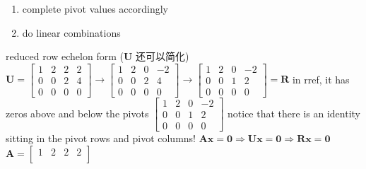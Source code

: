 \documentclass[12pt, a4paper]{article}
\begin{document}
{\begin{enumerate}
	\item complete pivot values accordingly
	\item do linear combinations
\end{enumerate}
\vspace{14pt}
reduced row echelon form (${\mathbf{U}}$ 还可以简化)
\newline
\begin{math}
	{\mathbf{U}} = 
	\begin{bmatrix}
		1 & 2 & 2 & 2 \\
		0 & 0 & 2 & 4 \\
		0 & 0 & 0 & 0 
	\end{bmatrix}
	\longrightarrow
	\begin{bmatrix}
		1 & 2 & 0 & -2 \\
		0 & 0 & 2 & 4 \\
		0 & 0 & 0 & 0 
	\end{bmatrix}
	\longrightarrow
	\begin{bmatrix}
		{\boxed{1}} & 2 & 0 & -2 \\
		0 & 0 & {\boxed{1}} & 2 \\
		0 & 0 & 0 & 0 
	\end{bmatrix}
	 = 
	{\mathbf{R}}
\end{math}
\newline
in rref, it has zeros above and below the pivots
\vspace{14pt}
\newline
\begin{math}
	\begin{bmatrix}
		{\boxed{1}} & 2 & 0 & -2 \\
		0 & 0 & {\boxed{1}} & 2 \\
		0 & 0 & 0 & 0 
	\end{bmatrix}
\end{math}
\newline
notice that there is an identity sitting in the pivot rows and pivot columns!
\vspace{14pt}
\newline
\begin{math}
	{\mathbf{A}}{\mathbf{x}} = {\mathbf{0}}
	\Longrightarrow
	{\mathbf{U}}{\mathbf{x}} = {\mathbf{0}}
	\Longrightarrow
	{\mathbf{R}}{\mathbf{x}} = {\mathbf{0}}
\end{math}
\vspace{31pt}
\newline
\begin{math}
	{\mathbf{A}} = 
	\begin{bmatrix}
		1 & 2 & 2 & 2 \\

\end{bmatrix}
\end{math}}
\end{document}
